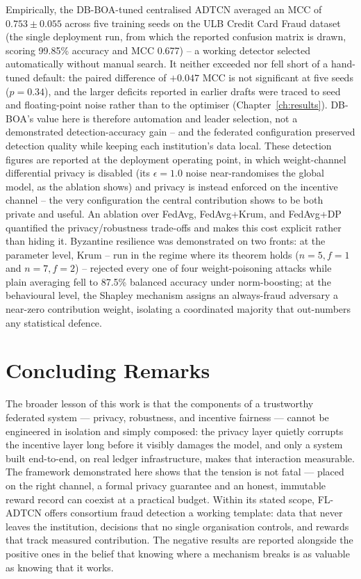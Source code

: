Empirically, the DB-BOA-tuned centralised ADTCN averaged an MCC of $0.753 \pm 0.055$ across five training seeds on the ULB Credit Card Fraud dataset (the single deployment run, from which the reported confusion matrix is drawn, scoring 99.85\% accuracy and MCC 0.677) -- a working detector selected automatically without manual search. It neither exceeded nor fell short of a hand-tuned default: the paired difference of $+0.047$ MCC is not significant at five seeds ($p=0.34$), and the larger deficits reported in earlier drafts were traced to seed and floating-point noise rather than to the optimiser (Chapter~\ref{ch:results}). DB-BOA's value here is therefore automation and leader selection, not a demonstrated detection-accuracy gain -- and the federated configuration preserved detection quality while keeping each institution's data local. These detection figures are reported at the deployment operating point, in which weight-channel differential privacy is disabled (its $\epsilon=1.0$ noise near-randomises the global model, as the ablation shows) and privacy is instead enforced on the incentive channel -- the very configuration the central contribution shows to be both private and useful. An ablation over FedAvg, FedAvg+Krum, and FedAvg+DP quantified the privacy/robustness trade-offs and makes this cost explicit rather than hiding it. Byzantine resilience was demonstrated on two fronts: at the parameter level, Krum -- run in the regime where its theorem holds ($n=5,f=1$ and $n=7,f=2$) -- rejected every one of four weight-poisoning attacks while plain averaging fell to 87.5\% balanced accuracy under norm-boosting; at the behavioural level, the Shapley mechanism assigns an always-fraud adversary a near-zero contribution weight, isolating a coordinated majority that out-numbers any statistical defence.

\section{Concluding Remarks}

The broader lesson of this work is that the components of a trustworthy federated system --- privacy, robustness, and incentive fairness --- cannot be engineered in isolation and simply composed: the privacy layer quietly corrupts the incentive layer long before it visibly damages the model, and only a system built end-to-end, on real ledger infrastructure, makes that interaction measurable. The framework demonstrated here shows that the tension is not fatal --- placed on the right channel, a formal privacy guarantee and an honest, immutable reward record can coexist at a practical budget. Within its stated scope, FL-ADTCN offers consortium fraud detection a working template: data that never leaves the institution, decisions that no single organisation controls, and rewards that track measured contribution. The negative results are reported alongside the positive ones in the belief that knowing where a mechanism breaks is as valuable as knowing that it works.

